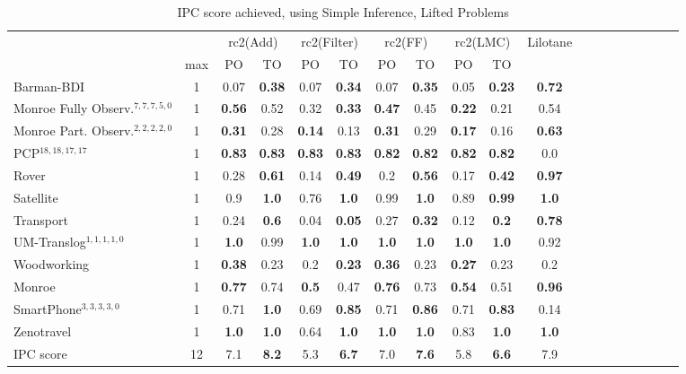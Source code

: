 \documentclass[letterpaper]{article} %
\begin{document}
\begin{table*}[h]
	\centering
	\caption{IPC score achieved, using Simple Inference, Lifted Problems}
\begin{tabular}{lccccccccccccccccccl} 
	\toprule 
	&& \multicolumn{2}{c}{rc2(Add)} & \multicolumn{2}{c}{rc2(Filter)} & \multicolumn{2}{c}{rc2(FF)} & \multicolumn{2}{c}{rc2(LMC)}  & \multicolumn{2}{c}{Lilotane} \\ 
	\cmidrule(lr){3-4} \cmidrule(lr){5-6} \cmidrule(lr){7-8} \cmidrule(lr){9-10} \cmidrule(lr){11-12}  
	& max &PO & TO & PO & TO & PO & TO & PO &\multicolumn{2}{c}{ TO  } \\ 
	\midrule 
	Barman-BDI & 1 & 0.07 & \textbf{0.38} & 0.07 & \textbf{0.34} & 0.07 & \textbf{0.35} & 0.05 & \textbf{0.23} &\multicolumn{2}{c}{ \textbf{0.72}  } \\ 
	Monroe Fully Observ.$^{7,7,7,5,0}$ & 1 & \textbf{0.56} & 0.52 & 0.32 & \textbf{0.33} & \textbf{0.47} & 0.45 & \textbf{0.22} & 0.21 &\multicolumn{2}{c}{ 0.54  } \\ 
	Monroe Part. Observ.$^{2,2,2,2,0}$ & 1 & \textbf{0.31} & 0.28 & \textbf{0.14} & 0.13 & \textbf{0.31} & 0.29 & \textbf{0.17} & 0.16 &\multicolumn{2}{c}{ \textbf{0.63}  } \\ 
	PCP$^{18,18,17,17}$ & 1 & \textbf{0.83} & \textbf{0.83} & \textbf{0.83} & \textbf{0.83} & \textbf{0.82} & \textbf{0.82} & \textbf{0.82} & \textbf{0.82} &\multicolumn{2}{c}{ 0.0  } \\ 
	Rover & 1 & 0.28 & \textbf{0.61} & 0.14 & \textbf{0.49} & 0.2 & \textbf{0.56} & 0.17 & \textbf{0.42} &\multicolumn{2}{c}{ \textbf{0.97}  } \\ 
	Satellite & 1 & 0.9 & \textbf{1.0} & 0.76 & \textbf{1.0} & 0.99 & \textbf{1.0} & 0.89 & \textbf{0.99} &\multicolumn{2}{c}{ \textbf{1.0}  } \\ 
	Transport & 1 & 0.24 & \textbf{0.6} & 0.04 & \textbf{0.05} & 0.27 & \textbf{0.32} & 0.12 & \textbf{0.2} &\multicolumn{2}{c}{ \textbf{0.78}  } \\ 
	UM-Translog$^{1,1,1,1,0}$ & 1 & \textbf{1.0} & 0.99 & \textbf{1.0} & \textbf{1.0} & \textbf{1.0} & \textbf{1.0} & \textbf{1.0} & \textbf{1.0} &\multicolumn{2}{c}{ 0.92  } \\ 
	Woodworking & 1 & \textbf{0.38} & 0.23 & 0.2 & \textbf{0.23} & \textbf{0.36} & 0.23 & \textbf{0.27} & 0.23 &\multicolumn{2}{c}{ 0.2  } \\ 
	\midrule 
	Monroe & 1 & \textbf{0.77} & 0.74 & \textbf{0.5} & 0.47 & \textbf{0.76} & 0.73 & \textbf{0.54} & 0.51 &\multicolumn{2}{c}{ \textbf{0.96}  } \\ 
	SmartPhone$^{3,3,3,3,0}$ & 1 & 0.71 & \textbf{1.0} & 0.69 & \textbf{0.85} & 0.71 & \textbf{0.86} & 0.71 & \textbf{0.83} &\multicolumn{2}{c}{ 0.14  } \\  
	Zenotravel & 1 & \textbf{1.0} & \textbf{1.0} & 0.64 & \textbf{1.0} & \textbf{1.0} & \textbf{1.0} & 0.83 & \textbf{1.0} &\multicolumn{2}{c}{ \textbf{1.0}  } \\ 
	\midrule 
	IPC score & 12 & 7.1 & \textbf{8.2} & 5.3 & \textbf{6.7} & 7.0 & \textbf{7.6} & 5.8 & \textbf{6.6} &\multicolumn{2}{c}{ 7.9  } \\ 
	\bottomrule 
\end{tabular} 
\end{table*} 
\end{document}
